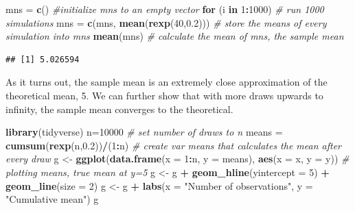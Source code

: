\documentclass[
]{article}
\newenvironment{Shaded}{\begin{snugshade}}{\end{snugshade}}
\newcommand{\CommentTok}[1]{\textcolor[rgb]{0.56,0.35,0.01}{\textit{#1}}}
\newcommand{\ControlFlowTok}[1]{\textcolor[rgb]{0.13,0.29,0.53}{\textbf{#1}}}
\newcommand{\DataTypeTok}[1]{\textcolor[rgb]{0.13,0.29,0.53}{#1}}
\newcommand{\DecValTok}[1]{\textcolor[rgb]{0.00,0.00,0.81}{#1}}
\newcommand{\FloatTok}[1]{\textcolor[rgb]{0.00,0.00,0.81}{#1}}
\newcommand{\KeywordTok}[1]{\textcolor[rgb]{0.13,0.29,0.53}{\textbf{#1}}}
\newcommand{\NormalTok}[1]{#1}
\newcommand{\OperatorTok}[1]{\textcolor[rgb]{0.81,0.36,0.00}{\textbf{#1}}}
\newcommand{\StringTok}[1]{\textcolor[rgb]{0.31,0.60,0.02}{#1}}
\begin{document}
\begin{Shaded}
\begin{Highlighting}[]
\NormalTok{mns =}\StringTok{ }\KeywordTok{c}\NormalTok{() }\CommentTok{#initialize mns to an empty vector}
\ControlFlowTok{for}\NormalTok{ (i }\ControlFlowTok{in} \DecValTok{1}\OperatorTok{:}\DecValTok{1000}\NormalTok{) }\CommentTok{# run 1000 simulations}
\NormalTok{  mns =}\StringTok{ }\KeywordTok{c}\NormalTok{(mns, }\KeywordTok{mean}\NormalTok{(}\KeywordTok{rexp}\NormalTok{(}\DecValTok{40}\NormalTok{,}\FloatTok{0.2}\NormalTok{))) }\CommentTok{# store the means of every simulation into mns}
\KeywordTok{mean}\NormalTok{(mns) }\CommentTok{# calculate the mean of mns, the sample mean}
\end{Highlighting}
\end{Shaded}

\begin{verbatim}
## [1] 5.026594
\end{verbatim}

As it turns out, the sample mean is an extremely close approximation of
the theoretical mean, 5. We can further show that with more draws
upwards to infinity, the sample mean converges to the theoretical.

\begin{Shaded}
\begin{Highlighting}[]
\KeywordTok{library}\NormalTok{(tidyverse)}
\NormalTok{n=}\DecValTok{10000} \CommentTok{# set number of draws to n}
\NormalTok{means =}\StringTok{ }\KeywordTok{cumsum}\NormalTok{(}\KeywordTok{rexp}\NormalTok{(n,}\FloatTok{0.2}\NormalTok{))}\OperatorTok{/}\NormalTok{(}\DecValTok{1}\OperatorTok{:}\NormalTok{n) }\CommentTok{# create var means that calculates the mean after every draw}
\NormalTok{g <-}\StringTok{ }\KeywordTok{ggplot}\NormalTok{(}\KeywordTok{data.frame}\NormalTok{(}\DataTypeTok{x =} \DecValTok{1}\OperatorTok{:}\NormalTok{n, }\DataTypeTok{y =}\NormalTok{ means), }\KeywordTok{aes}\NormalTok{(}\DataTypeTok{x =}\NormalTok{ x, }\DataTypeTok{y =}\NormalTok{ y)) }\CommentTok{# plotting means, true mean at y=5}
\NormalTok{g <-}\StringTok{ }\NormalTok{g }\OperatorTok{+}\StringTok{ }\KeywordTok{geom_hline}\NormalTok{(}\DataTypeTok{yintercept =} \DecValTok{5}\NormalTok{) }\OperatorTok{+}\StringTok{ }\KeywordTok{geom_line}\NormalTok{(}\DataTypeTok{size =} \DecValTok{2}\NormalTok{) }
\NormalTok{g <-}\StringTok{ }\NormalTok{g }\OperatorTok{+}\StringTok{ }\KeywordTok{labs}\NormalTok{(}\DataTypeTok{x =} \StringTok{"Number of observations"}\NormalTok{, }\DataTypeTok{y =} \StringTok{"Cumulative mean"}\NormalTok{)}
\NormalTok{g}
\end{Highlighting}
\end{Shaded}
\end{document}
